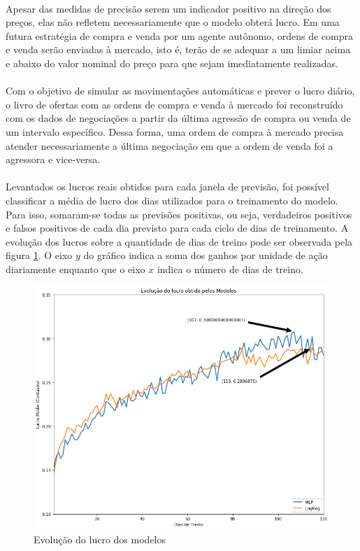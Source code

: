 \documentclass[grad,numbers]{coppe}
\begin{document}
        
        \paragraph{}Apesar das medidas de precisão serem um indicador positivo na direção dos preços, elas não refletem necessariamente que o modelo obterá lucro. Em uma futura estratégia de compra e venda por um agente autônomo, ordens de compra e venda serão enviadas à mercado, isto é, terão de se adequar a um limiar acima e abaixo do valor nominal do preço para que sejam imediatamente realizadas. 
        
        \paragraph{}Com o objetivo de simular as movimentações automáticas e prever o lucro diário, o livro de ofertas com as ordens de compra e venda à mercado foi reconstruído com os dados de negociações a partir da última agressão de compra ou venda de um intervalo específico. Dessa forma, uma ordem de compra à mercado precisa atender necessariamente a última negociação em que a ordem de venda foi a agressora e vice-versa.
        
        \paragraph{}Levantados os lucros reais obtidos para cada janela de previsão, foi possível classificar a média de lucro dos dias utilizados para o treinamento do modelo. Para isso, somaram-se todas as previsões positivas, ou seja, verdadeiros positivos e falsos positivos de cada dia previsto para cada ciclo de dias de treinamento. A evolução dos lucros sobre a quantidade de dias de treino pode ser observada pela figura \ref{img:lucro}. O eixo $y$ do gráfico indica a soma dos ganhos por unidade de ação diariamente enquanto que o eixo $x$ indica o número de dias de treino.
        
        \begin{figure}[h!]
            \caption{Evolução do lucro dos modelos}
            \label{img:lucro}
            \includegraphics[width=13.1cm]{lucro.png}
            \centering
        \end{figure}
        
\end{document}
